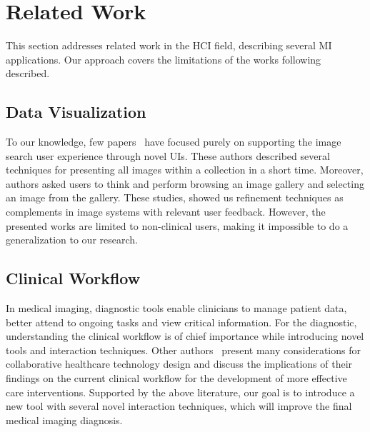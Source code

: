 \section{Related Work}
\label{sec:sec002}

This section addresses related work in the HCI field, describing several MI applications.
Our approach covers the limitations of the works following described.

\subsection{Data Visualization}

To our knowledge, few papers~\cite{10.1145/1133265.1133354, 10.1145/2909132.2909248, 10.1145/3206505.3206602} have focused purely on supporting the image search user experience through novel UIs.
These authors described several techniques for presenting all images within a collection in a short time.
Moreover, authors asked users to think and perform browsing an image gallery and selecting an image from the gallery.
These studies, showed us refinement techniques as complements in image systems with relevant user feedback.
However, the presented works are limited to non-clinical users, making it impossible to do a generalization to our research.


\subsection{Clinical Workflow}

In medical imaging, diagnostic tools enable clinicians to manage patient data, better attend to ongoing tasks and view critical information.
For the diagnostic, understanding the clinical workflow is of chief importance while introducing novel tools and interaction techniques.
Other authors~\cite{10.1145/2685553.2699332, 10.5555/2826165.2826187} present many considerations for collaborative healthcare technology design and discuss the implications of their findings on the current clinical workflow for the development of more effective care interventions.
Supported by the above literature, our goal is to introduce a new tool with several novel interaction techniques, which will improve the final medical imaging diagnosis.


